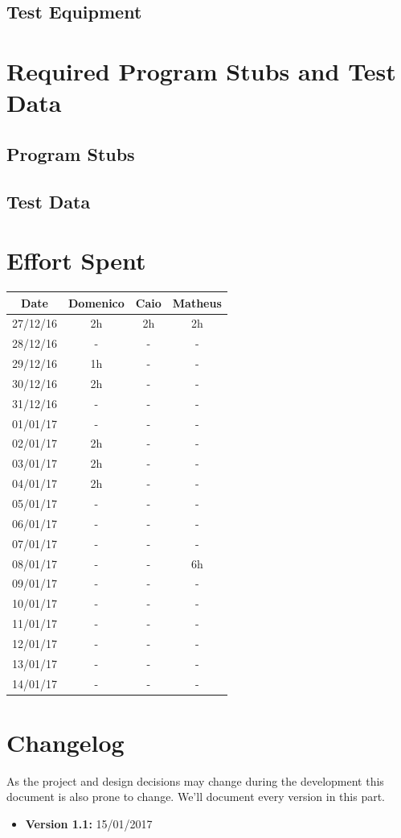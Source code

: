\documentclass[a4paper]{article}
\begin{document}
\subsection{Test Equipment}

\section{Required Program Stubs and Test Data}
\subsection{Program Stubs}
\subsection{Test Data}

\newpage
\section{Effort Spent}
\begin{tabular}{ | c | c | c | c | }
\hline
	\textbf {Date} & \textbf {Domenico} & \textbf {Caio} & \textbf {Matheus} \\ \hline
	27/12/16& 2h & 2h & 2h  \\ \hline
	28/12/16& - & - & - \\ \hline
	29/12/16& 1h & - & - \\ \hline
	30/12/16& 2h & - & - \\ \hline
	31/12/16& - & - & - \\ \hline
	01/01/17& - & - & - \\ \hline
	02/01/17& 2h & - & - \\ \hline
	03/01/17& 2h & - & - \\ \hline
	04/01/17& 2h & - & - \\ \hline
	05/01/17& - & - & - \\ \hline
	06/01/17& - & - & - \\ \hline
	07/01/17& - & - & - \\ \hline
	08/01/17& - & - & 6h \\ \hline
	09/01/17& - & - & - \\ \hline
	10/01/17& - & - & - \\ \hline
	11/01/17& - & - & - \\ \hline
	12/01/17& - & - & - \\ \hline
	13/01/17& - & - & - \\ \hline
	14/01/17& - & - & - \\ \hline
\end{tabular}
\newpage

\section{Changelog}
As the project and design decisions may change during the development this document is also prone to change.
We'll document every version in this part.
\begin{itemize}
\item \textbf {Version 1.1:} 15/01/2017
\end{itemize}
\end{document}
